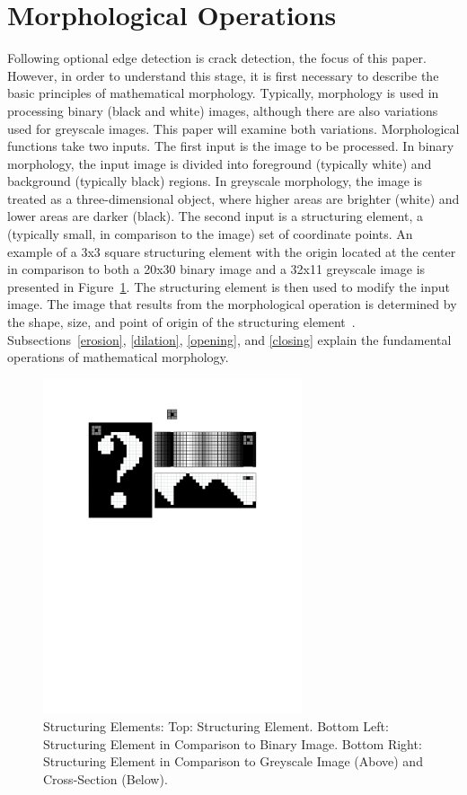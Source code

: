\documentclass{sig-alternate}
\begin{document}
\section{Morphological Operations}\label{morphological operations}
Following optional edge detection is crack detection, the focus of this paper. However, in order to understand this stage, it is first necessary to describe the basic principles of mathematical morphology. Typically, morphology is used in processing binary (black and white) images, although there are also variations used for greyscale images. This paper will examine both variations. Morphological functions take two inputs. The first input is the image to be processed. In binary morphology, the input image is divided into foreground (typically white) and background (typically black) regions. In greyscale morphology, the image is treated as a three-dimensional object, where higher areas are brighter (white) and lower areas are darker (black). The second input is a structuring element, a (typically small, in comparison to the image) set of coordinate points. An example of a 3x3 square structuring element with the origin located at the center in comparison to both a 20x30 binary image and a 32x11 greyscale image is presented in Figure~\ref{structuring element figure}. The structuring element is then used to modify the input image. The image that results from the morphological operation is determined by the shape, size, and point of origin of the structuring element~\cite{MorphologyWikiAnonymous, MorphologyBook:2000, MorphologyPaper:1987, MorphologyWiki}. Subsections~\ref{erosion}, \ref{dilation}, \ref{opening}, and \ref{closing} explain the fundamental operations of mathematical morphology.
\begin{figure}
\centering
\includegraphics[width=3in,trim={0 6.5in 0 0},clip]{structuring_element}
\caption{Structuring Elements: Top: Structuring Element. Bottom Left: Structuring Element in Comparison to Binary Image. Bottom Right: Structuring Element in Comparison to Greyscale Image (Above) and Cross-Section (Below).}
\label{structuring element figure}
\end{figure}
\end{document}
